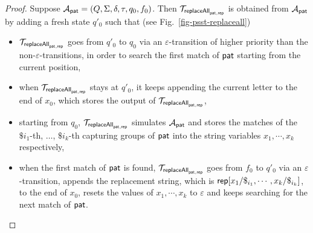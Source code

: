 \begin{proof}
        Suppose $\mathcal{A}_{\mathsf{pat}} = (Q, \Sigma, \delta, \tau, q_0, f_0)$. Then $\mathcal{T}_{\mathsf{replaceAll}_{\mathsf{pat},\mathsf{rep}}}$ is obtained from $\mathcal{A}_{\mathsf{pat}}$ by adding a fresh state $q'_0$ such that (see Fig.~\ref{fig-psst-replaceall})
        \begin{itemize}
            \item $\mathcal{T}_{\mathsf{replaceAll}_{\mathsf{pat},\mathsf{rep}}}$ goes from $q'_0$ to $q_0$ via an $\varepsilon$-transition of higher priority than the non-$\varepsilon$-transitions, in order to search the first match of $\mathsf{pat}$ starting from the current position,
            \item when $\mathcal{T}_{\mathsf{replaceAll}_{\mathsf{pat},\mathsf{rep}}}$ stays at $q'_0$, it keeps appending the current letter to the end of $x_0$, which stores the output of $\mathcal{T}_{\mathsf{replaceAll}_{\mathsf{pat},\mathsf{rep}}}$,
            \item starting from $q_0$, $\mathcal{T}_{\mathsf{replaceAll}_{\mathsf{pat},\mathsf{rep}}}$ simulates $\mathcal{A}_{\mathsf{pat}}$ and stores the matches of the $\$i_1$-th, $\ldots$, $\$i_k$-th capturing groups of $\mathsf{pat}$ into the string variables $x_1, \cdots, x_k$ respectively,
            \item when the first match of $\mathsf{pat}$ is found, $\mathcal{T}_{\mathsf{replaceAll}_{\mathsf{pat},\mathsf{rep}}}$ goes from $f_0$ to $q'_0$ via an $\varepsilon$-transition, appends the replacement string, which is $\mathsf{rep}[x_1/\$_{i_1}, \cdots, x_k/\$_{i_k}]$, to the end of $x_0$, resets the values of $x_1,\cdots,x_k$ to $\varepsilon$ and keeps searching for the next match of $\mathsf{pat}$.
        \end{itemize}


\end{proof}
